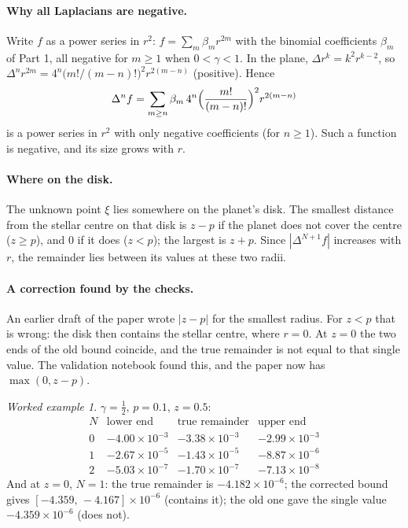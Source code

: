\documentclass[11pt,a4paper]{article}
\theoremstyle{remark}
\newtheorem*{example}{Worked example}
\begin{document}
\paragraph{Why all Laplacians are negative.} Write $f$ as a power series in $r^2$:
$f=\sum_m\beta_mr^{2m}$ with the binomial coefficients $\beta_m$ of Part 1, all negative for
$m\ge1$ when $0<\gamma<1$. In the plane, $\Delta r^{k}=k^2r^{k-2}$, so
$\Delta^nr^{2m}=4^n\bigl(m!/(m-n)!\bigr)^2r^{2(m-n)}$ (positive). Hence
\[
  \Delta^nf=\sum_{m\ge n}\beta_m\,4^n\Bigl(\frac{m!}{(m-n)!}\Bigr)^2r^{2(m-n)}
\]
is a power series in $r^2$ with only negative coefficients (for $n\ge1$). Such a function is
negative, and its size grows with $r$.

\paragraph{Where on the disk.} The unknown point $\xi$ lies somewhere on the planet's disk. The
smallest distance from the stellar centre on that disk is $z-p$ if the planet does not cover the
centre ($z\ge p$), and $0$ if it does ($z<p$); the largest is $z+p$. Since $|\Delta^{N+1}f|$
increases with $r$, the remainder lies between its values at these two radii.

\paragraph{A correction found by the checks.} An earlier draft of the paper wrote $|z-p|$ for the
smallest radius. For $z<p$ that is wrong: the disk then contains the stellar centre, where $r=0$.
At $z=0$ the two ends of the old bound coincide, and the true remainder is not equal to that
single value. The validation notebook found this, and the paper now has $\max(0,z-p)$.

\begin{example}
$\gamma=\tfrac12$, $p=0.1$, $z=0.5$:
\[
\begin{array}{c|ccc}
 N & \text{lower end} & \text{true remainder} & \text{upper end}\\\hline
 0 & -4.00\times10^{-3} & -3.38\times10^{-3} & -2.99\times10^{-3}\\
 1 & -2.67\times10^{-5} & -1.43\times10^{-5} & -8.87\times10^{-6}\\
 2 & -5.03\times10^{-7} & -1.70\times10^{-7} & -7.13\times10^{-8}
\end{array}
\]
And at $z=0$, $N=1$: the true remainder is $-4.182\times10^{-6}$; the corrected bound gives
$[-4.359,\,-4.167]\times10^{-6}$ (contains it); the old one gave the single value
$-4.359\times10^{-6}$ (does not).
\end{example}
\end{document}
